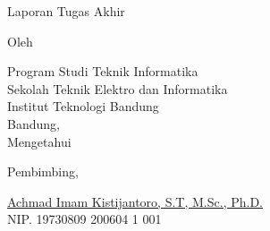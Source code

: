 \clearpage
\pagestyle{empty}

\begin{center}
  \smallskip
  
  \Large \bfseries \MakeUppercase{\thetitle}
  \vfill
  
  \Large Laporan Tugas Akhir
  \vfill
  
  \large Oleh
  
  \Large \theauthor
  
  \large Program Studi Teknik Informatika \\
  
  \normalsize \normalfont
  Sekolah Teknik Elektro dan Informatika \\
  Institut Teknologi Bandung \\
  
  \vfill
  \normalsize \normalfont
  Bandung, \tanggalpengesahan \\
  Mengetahui

  \vspace{0.5cm}
  Pembimbing,
  
  \vfill
  \underline{Achmad Imam Kistijantoro, S.T, M.Sc., Ph.D.
  } \\
  NIP. 19730809 200604 1 001
  
\end{center}
\clearpage

